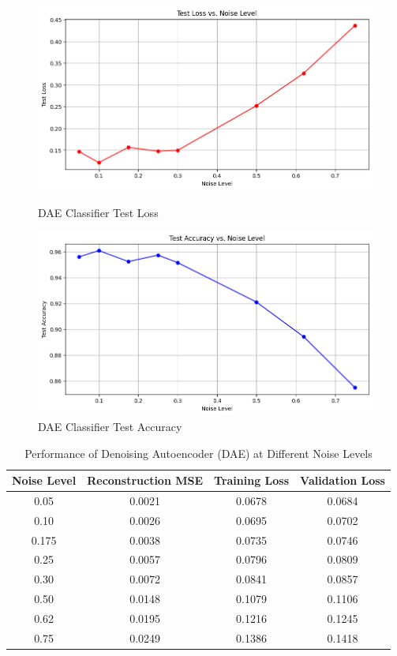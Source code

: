\begin{figure}[htbp]
  \centering
  \begin{minipage}{0.49\textwidth}
    \includegraphics[width=\linewidth]{figures/dae_testloss.png}
    \caption{DAE Classifier Test Loss}
    \label{fig:dae_testloss}
  \end{minipage}\hfill
  \begin{minipage}{0.49\textwidth}
    \includegraphics[width=\linewidth]{figures/dae_testaccuracy.png}
    \caption{DAE Classifier Test Accuracy}
    \label{fig:dae_testaccuracy}
  \end{minipage}
\end{figure}

\vspace*{1.5in}

\begin{table}[ht]
\centering
\label{tab:dae_performance}
\begin{tabular}{c|c|c|c}
\toprule
\textbf{Noise Level} & \textbf{Reconstruction MSE} & \textbf{Training Loss} & \textbf{Validation Loss} \\
\midrule
0.05 & 0.0021 & 0.0678 & 0.0684 \\
0.10 & 0.0026 & 0.0695 & 0.0702 \\
0.175 & 0.0038 & 0.0735 & 0.0746 \\
0.25 & 0.0057 & 0.0796 & 0.0809 \\
0.30 & 0.0072 & 0.0841 & 0.0857 \\
0.50 & 0.0148 & 0.1079 & 0.1106 \\
0.62 & 0.0195 & 0.1216 & 0.1245 \\
0.75 & 0.0249 & 0.1386 & 0.1418 \\
\bottomrule
\end{tabular}
\caption{Performance of Denoising Autoencoder (DAE) at Different Noise Levels}
\end{table}

